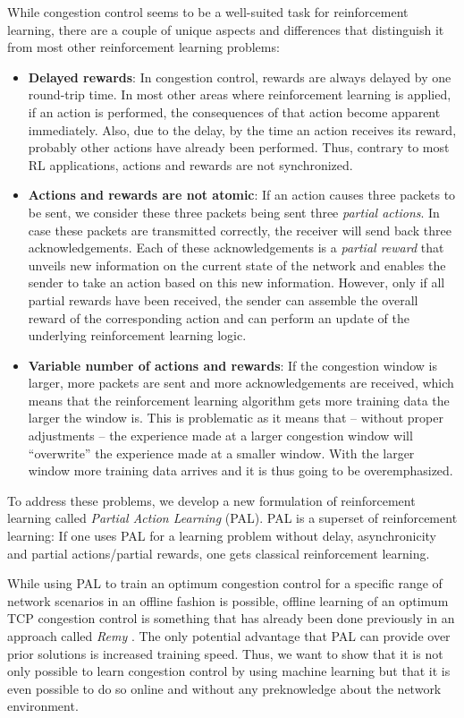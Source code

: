 \documentclass[newfonts=false,format=sigconf,10pt,letterpaper]{acmart}
\begin{document}
While congestion control seems to be a well-suited task for reinforcement learning, there are a couple of unique aspects and differences that distinguish it from most other reinforcement learning problems:  \begin{itemize}
\item \textbf{Delayed rewards}: In congestion control, rewards are always delayed by one round-trip time. In most other areas where reinforcement learning is applied, if an action is performed, the consequences of that action become apparent immediately. Also, due to the delay, by the time an action receives its reward, probably other actions have already been performed. Thus, contrary to most RL applications, actions and rewards are not synchronized. 
\item \textbf{Actions and rewards are not atomic}: If an action causes three packets to be sent, we consider these three packets being sent three \textit{partial actions}. In case these packets are transmitted correctly, the receiver will send back three acknowledgements. Each of these acknowledgements is a \textit{partial reward} that unveils new information on the current state of the network and enables the sender to take an action based on this new information. However, only if all partial rewards have been received, the sender can assemble the overall reward of the corresponding action and can perform an update of the underlying reinforcement learning logic. 
\item \textbf{Variable number of actions and rewards}: If the congestion window is larger, more packets are sent and more acknowledgements are received, which means that the reinforcement learning algorithm gets more training data the larger the window is. This is problematic as it means that -- without proper adjustments -- the experience made at a larger congestion window will ``overwrite'' the experience made at a smaller window. With the larger window more training data arrives and it is thus going to be overemphasized. 
\end{itemize}

To address these problems, we develop a new formulation of reinforcement learning called \textit{Partial Action Learning} (PAL). PAL is a superset of reinforcement learning: If one uses PAL for a learning problem without delay, asynchronicity and partial actions/partial rewards, one gets classical reinforcement learning.

While using PAL to train an optimum congestion control for a specific range of network scenarios in an offline fashion is possible, offline learning of an optimum TCP congestion control is something that has already been done previously in an approach called \textit{Remy} \citep{winstein_tcp_2013}. The only potential advantage that PAL can provide over prior solutions is increased training speed. Thus, we want to show that it is  not only possible to learn congestion control by using machine learning but that it is even possible to do so online and without any preknowledge about the network environment.
\end{document}
